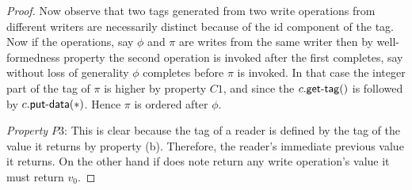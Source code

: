 {\begin{proof}
	Now observe that two tags generated from two write operations from different writers are necessarily distinct because of the 
	id component of the tag. Now if the operations, say $\phi$ and $\pi$ are writes  from the same writer then by 
	well-formedness property the second operation is invoked after the first completes, say without loss of generality $\phi$ completes before 
	$\pi$ is invoked.   In that case the integer part of the tag of $\pi$ is higher 
	by property  $C1$, and since the $\dagettag{c}$  is followed by $\daputdata{c}{*}$. Hence $\pi$ is ordered after $\phi$. 
	
	\emph{Property $P3$}:  This is clear because the tag of a reader is defined by the tag of the value it returns by property (b).
	Therefore, the reader's immediate previous value it returns. On the other hand if  does 
	note return any write operation's value it must return $v_0$.
 \end{proof}
}


